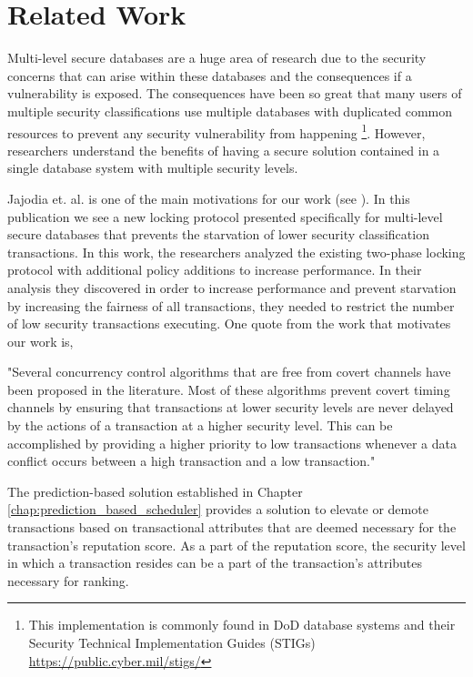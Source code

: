 \section{Related Work}
\label{mls:related_work}

Multi-level secure databases are a huge area of research due to the security concerns that can arise within these databases and the consequences if a vulnerability is exposed. The consequences have been so great that many users of multiple security classifications use multiple databases with duplicated common resources to prevent any security vulnerability from happening \footnote{This implementation is commonly found in DoD database systems and their Security Technical Implementation Guides (STIGs) \hyperlink{https://public.cyber.mil/stigs/}{https://public.cyber.mil/stigs/}}. However, researchers understand the benefits of having a secure solution contained in a single database system with multiple security levels.

Jajodia et. al. is one of the main motivations for our work (see \cite{jajodia_fair_1998}). In this publication we see a new locking protocol presented specifically for multi-level secure databases that prevents the starvation of lower security classification transactions. In this work, the researchers analyzed the existing two-phase locking protocol with additional policy additions to increase performance. In their analysis they discovered in order to increase performance and prevent starvation by increasing the fairness of all transactions, they needed to restrict the number of low security transactions executing. One quote from the work that motivates our work is,

\begin{displayquote}
"Several concurrency control algorithms that are free from covert channels have been proposed in the literature. Most of these algorithms prevent covert timing channels by ensuring that transactions at lower security levels are never delayed by the actions of a transaction at a higher security level. This can be accomplished by providing a higher priority to low transactions whenever a data conflict occurs between a high transaction and a low transaction."
\end{displayquote}

The prediction-based solution established in Chapter \ref{chap:prediction_based_scheduler} provides a solution to elevate or demote transactions based on transactional attributes that are deemed necessary for the transaction's reputation score. As a part of the reputation score, the security level in which a transaction resides can be a part of the transaction's attributes necessary for ranking.

